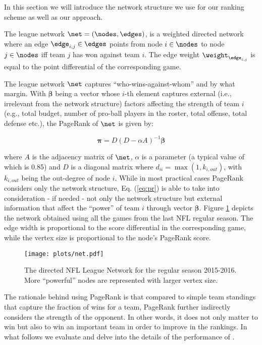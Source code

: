 In this section we will introduce the network structure we use for our ranking scheme as well as our approach. 

\begin{lemma}
The league network $\net=(\nodes,\edges)$, is a weighted directed network where an edge $\edge_{i,j} \in \edges$ points from node $i\in \nodes$ to node $j\in \nodes$ iff team $j$ has won against team $i$.  The edge weight $\weight_{\edge_{i,j}}$ is equal to the point differential of the corresponding game.
\label{def:net}
\end{lemma}  

The league network $\net$ captures ``who-wins-against-whom'' and by what margin.  
With $\bm{\beta}$ being a vector whose $i$-th element captures external (i.e., irrelevant from the network structure) factors affecting the strength of team $i$ (e.g., total budget, number of pro-ball players in the roster, total offense, total defense etc.), the PageRank of $\net$ is given by: 

\begin{equation}
\bm{\pi} = D(D-\alpha A)^{-1}\bm{\beta}
\label{eq:pr}
\end{equation}

\noindent where $A$ is the adjacency matrix of $\net$, $\alpha$ is a parameter (a typical value of which is 0.85) and $D$ is a diagonal matrix where $d_{ii} = \max(1,k_{i,out})$, with $k_{i,out}$ being the out-degree of node $i$.  
While in most practical cases PageRank considers only the network structure, Eq. (\ref{eq:pr}) is able to take into consideration - if needed - not only the network structure but external information that affect the ``power'' of team $i$ through vector $\bm{\beta}$.  
Figure \ref{fig:net} depicts the network obtained using all the games from the last NFL regular season.  
The edge width is proportional to the score differential in the corresponding game, while the vertex size is proportional to the node's PageRank score. 

\begin{figure}[t]
\begin{center}
\texttt{[image: plots/net.pdf]}%
 \caption{The directed NFL League Network for the regular season 2015-2016.  More ``powerful'' nodes are represented with larger vertex size.}
 \label{fig:net}
\end{center}
\vspace{-0.2in}
\end{figure}


The rationale behind using PageRank is that compared to simple team standings that capture the fraction of wins for a team, PageRank further indirectly considers the strength of the opponent. 
In other words, it does not only matter to win but also to win an important team in order to improve in the rankings.  
In what follows we evaluate and delve into the details of the performance of {\method}.
